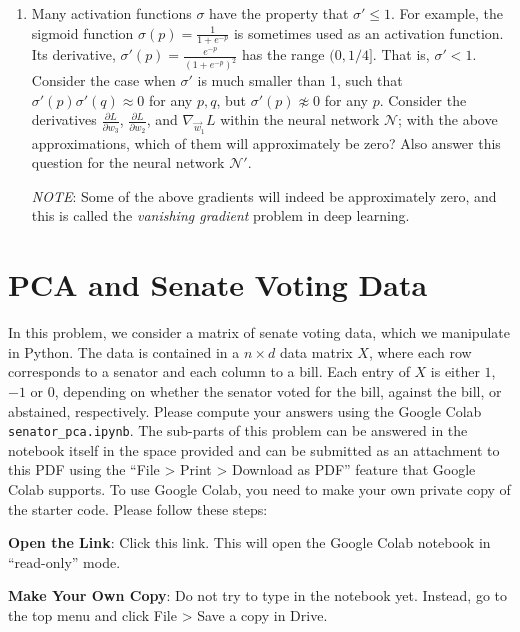 \documentclass[10pt]{article}
\theoremstyle{definition}
\theoremstyle{plain}
\begin{document}
\begin{enumerate}[label=(\alph*)]
Express the remaining derivatives $\frac{\partial L}{\partial w_2}$ and $\nabla_{\vec{w}_1} L$ within $\mathcal{N}$ and $\mathcal{N}'$.

\item Many activation functions $\sigma$ have the property that $\sigma' \leq 1$. For example, the sigmoid function $\sigma(p) = \frac{1}{1+e^{-p}}$ is sometimes used as an activation function. Its derivative, $\sigma'(p) = \frac{e^{-p}}{(1+e^{-p})^2}$ has the range $(0, 1/4]$. That is, $\sigma' < 1$. Consider the case when $\sigma'$ is much smaller than 1, such that $\sigma'(p)\sigma'(q) \approx 0$ for any $p, q$, but $\sigma'(p) \not\approx 0$ for any $p$. Consider the derivatives $\frac{\partial L}{\partial w_3}$, $\frac{\partial L}{\partial w_2}$, and $\nabla_{\vec{w}_1} L$ within the neural network $\mathcal{N}$; with the above approximations, which of them will approximately be zero? Also answer this question for the neural network $\mathcal{N}'$.

\textit{NOTE}: Some of the above gradients will indeed be approximately zero, and this is called the \emph{vanishing gradient} problem in deep learning.
\end{enumerate}

\section{PCA and Senate Voting Data}

In this problem, we consider a matrix of senate voting data, which we manipulate in Python. The data is contained in a $n \times d$ data matrix $X$, where each row corresponds to a senator and each column to a bill. Each entry of $X$ is either $1$, $-1$ or $0$, depending on whether the senator voted for the bill, against the bill, or abstained, respectively. Please compute your answers using the Google Colab \texttt{senator\_pca.ipynb}. The sub-parts of this problem can be answered in the notebook itself in the space provided and can be submitted as an attachment to this PDF using the ``File > Print > Download as PDF'' feature that Google Colab supports. To use Google Colab, you need to make your own private copy of the starter code. Please follow these steps:

\textbf{Open the Link}: Click this link. This will open the Google Colab notebook in ``read-only'' mode.

\textbf{Make Your Own Copy}: Do not try to type in the notebook yet. Instead, go to the top menu and click File > Save a copy in Drive.
\end{document}
